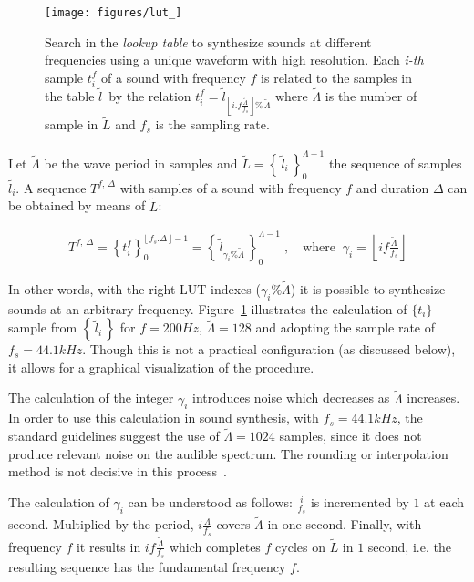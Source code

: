 \begin{figure}
    \centering
        \texttt{[image: figures/lut\_]}
    \caption{Search in the \emph{lookup table} to synthesize sounds at different frequencies using a unique waveform with high resolution.
	Each \emph{i-th} sample $t_i^f$ of a sound with frequency $f$ is related to the samples in the table $\widetilde{l}$\, by the relation $t_i^{f}=\widetilde{l}_{\left\lfloor i.f\frac{\widetilde{\Lambda}}{f_s} \right\rfloor \%\,\widetilde{\Lambda}}$ where $\widetilde{\Lambda}$ is the number of sample in $\widetilde{L}$ and $f_s$ is the sampling rate.}
        \label{fig:lut}
\end{figure}

Let $\widetilde{\Lambda}$ be the wave period in samples and $\widetilde{L} = \left\{\, \widetilde{l}_i \,\right\}_0^{\widetilde{\Lambda} -1}$ the sequence of samples $\widetilde{l_i}$. A sequence $T^{f,\,\Delta}$ with samples of a sound with frequency $f$ and duration $\Delta$ can be obtained by means of $\widetilde{L}$:

\begin{equation}\label{eq:lut}
\begin{split}
T^{f,\,\Delta}=\left\{t_i^f\right\}_0^{\lfloor \, f_s . \Delta \, \rfloor -1} = \left\{ \, \widetilde{l}_{\gamma_i \% \widetilde{\Lambda} }\, \right\}_{0}^{\Lambda-1}\; , \quad \text{where} \;\; \gamma_i = \left \lfloor i f \frac{ \widetilde{\Lambda}}{f_s} \right \rfloor  
\end{split}
\end{equation}

In other words, with the right LUT indexes ($\gamma_i\%\widetilde{\Lambda}$) it is possible to synthesize sounds at an arbitrary frequency. Figure~\ref{fig:lut} illustrates the calculation of $\{t_i\}$ sample from $\left\{\,\widetilde{l}_i\,\right\}$ for $f=200Hz$, $\widetilde{\Lambda}=128$ and adopting the sample rate of $f_s=44.1kHz$. Though this is not a practical configuration (as discussed below), it allows for a graphical visualization of the procedure.

The calculation of the integer $\gamma_i$ introduces noise which decreases as $\widetilde{\Lambda}$ increases.
In order to use this calculation in sound synthesis, with $f_s=44.1 kHz$, the standard guidelines suggest the use of $\widetilde{\Lambda} = 1024$ samples, since it does not produce relevant noise on the audible spectrum. The rounding or interpolation method is not decisive in this process~\cite{Geiger}.

The calculation of $\gamma_i$ can be understood as follows:
$\frac{i}{f_s}$
is incremented by $1$ at each second.
Multiplied by the period, $i \frac{\widetilde{\Lambda}}{f_s}$ covers $\widetilde{\Lambda}$ in one second.
Finally, with frequency $f$ it results in $i f \frac{\widetilde{\Lambda}}{f_s}$ which completes $f$ cycles on $\widetilde{L}$ in $1$ second, i.e. the resulting sequence has the fundamental frequency $f$.

